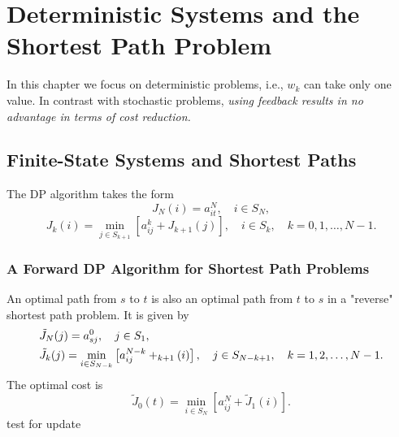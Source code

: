 \chapter{Deterministic Systems and the Shortest Path Problem}
In this chapter we focus on deterministic problems, i.e., $w_k$ can take only one value. In contrast with stochastic problems, \textit{using feedback results in no advantage in terms of cost reduction.} 

\section{Finite-State Systems and Shortest Paths}
The DP algorithm takes the form 
\begin{equation}
    J_N(i)=a_{it}^N,\quad i\in S_N,
\end{equation}
\begin{equation}
    J_k(i)=\min_{j\in S_{k+1}}\left[a_{ij}^k+J_{k+1}(j)\right],\quad i\in S_k,\quad k=0,1,\dots,N-1.
\end{equation}
\subsection*{A Forward DP Algorithm for Shortest Path Problems}
An optimal path from $s$ to $t$ is also an optimal path from $t$ to $s$ in a "reverse" shortest path problem. It is given by 
\begin{align}
    &\tilde{J}_N(j)=a_{sj}^0,\quad j\in S_1,\\
    &\tilde{J}_k(j)=\min_{i\in S_{N-k}}\left[a_{ij}^{N-k}+\title{J}_{k+1}(i)\right],\quad j\in S_{N-k+1},\quad k=1,2,\dots,N-1.
\end{align}
The optimal cost is 
\[\tilde{J}_0(t)=\min_{i\in S_N}\left[a_{ij}^N+\tilde{J}_1(i)\right].\]
 test for update